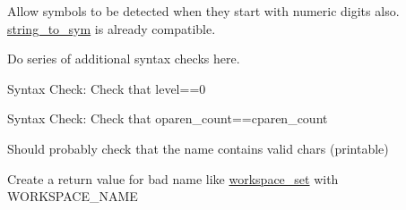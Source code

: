 
\begin{DoxyRefList}
\item[\label{todo__todo000001}%
\hypertarget{todo__todo000001}{}%
Global \hyperlink{expression__lite_8h_a63988c00ace0261c4896f132f5f86fda}{string\+\_\+to\+\_\+expression} (size\+\_\+t str\+\_\+len, char const $\ast$str)]Allow symbols to be detected when they start with numeric digits also. \hyperlink{symbolic_8h_a78aa047f421c2d8ab5fab3c72d123d1b}{string\+\_\+to\+\_\+sym} is already compatible. 

Do series of additional syntax checks here. 

Syntax Check\+: Check that level==0 

Syntax Check\+: Check that oparen\+\_\+count==cparen\+\_\+count  
\item[\label{todo__todo000005}%
\hypertarget{todo__todo000005}{}%
Global \hyperlink{symbolic_8h_a51d47153d7323b2941308b506bd90578}{sym\+\_\+new\+\_\+name} (char $\ast$name)]Should probably check that the name contains valid chars (printable)  
\item[\label{todo__todo000006}%
\hypertarget{todo__todo000006}{}%
Global \hyperlink{workspace_8h_a3af2e8d4387ce8986db09a9eb7328bc1}{workspace\+\_\+get} (char $\ast$name)]Create a return value for bad name like \hyperlink{workspace_8h_a536b0f47bc3b9177d1aaca025a05515a}{workspace\+\_\+set} with W\+O\+R\+K\+S\+P\+A\+C\+E\+\_\+\+N\+A\+M\+E 
\end{DoxyRefList}